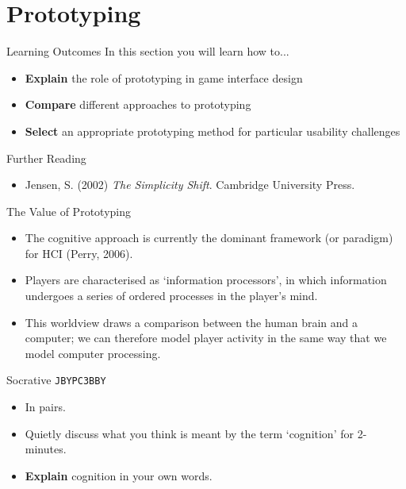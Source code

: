 \part{Prototyping}
\frame{\partpage}

\begin{frame}{Learning Outcomes}
	In this section you will learn how to...
	
	\begin{itemize}
		\item \textbf{Explain} the role of prototyping in game interface design
		\item \textbf{Compare} different approaches to prototyping
		\item \textbf{Select} an appropriate prototyping method for particular usability challenges
	\end{itemize}
\end{frame}

\begin{frame}{Further Reading}
	\begin{itemize}
		\item Jensen, S. (2002) \textit{The Simplicity Shift}. Cambridge University Press.
	\end{itemize}
\end{frame}

\begin{frame}{The Value of Prototyping}
	\begin{itemize}
		\item The cognitive approach is currently the dominant framework (or paradigm) for HCI (Perry, 2006).
		\item Players are characterised as `information processors', in which information undergoes a series of ordered processes
		in the player's mind.
		\item This worldview draws a comparison between the human brain and a computer; we can therefore model player activity in the same
		way that we model computer processing.
	\end{itemize}
\end{frame}

\begin{frame}[fragile]{Socrative \texttt{JBYPC3BBY}}
	\begin{itemize}
		\item In pairs.
		\item Quietly discuss what you think is meant by the term `cognition' for 2-minutes.
		\item \textbf{Explain} cognition in your own words.
	\end{itemize}
\end{frame}

